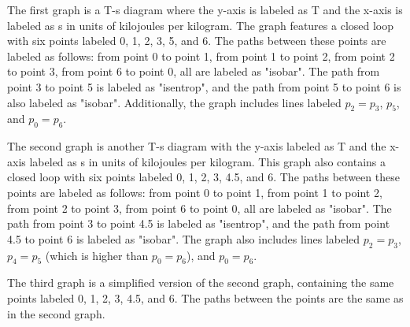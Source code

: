 The first graph is a T-s diagram where the y-axis is labeled as T and the x-axis is labeled as s in units of kilojoules per kilogram. The graph features a closed loop with six points labeled 0, 1, 2, 3, 5, and 6. The paths between these points are labeled as follows: from point 0 to point 1, from point 1 to point 2, from point 2 to point 3, from point 6 to point 0, all are labeled as "isobar". The path from point 3 to point 5 is labeled as "isentrop", and the path from point 5 to point 6 is also labeled as "isobar". Additionally, the graph includes lines labeled \( p_2 = p_3 \), \( p_5 \), and \( p_0 = p_6 \).

The second graph is another T-s diagram with the y-axis labeled as T and the x-axis labeled as s in units of kilojoules per kilogram. This graph also contains a closed loop with six points labeled 0, 1, 2, 3, 4.5, and 6. The paths between these points are labeled as follows: from point 0 to point 1, from point 1 to point 2, from point 2 to point 3, from point 6 to point 0, all are labeled as "isobar". The path from point 3 to point 4.5 is labeled as "isentrop", and the path from point 4.5 to point 6 is labeled as "isobar". The graph also includes lines labeled \( p_2 = p_3 \), \( p_4 = p_5 \) (which is higher than \( p_0 = p_6 \)), and \( p_0 = p_6 \).

The third graph is a simplified version of the second graph, containing the same points labeled 0, 1, 2, 3, 4.5, and 6. The paths between the points are the same as in the second graph.